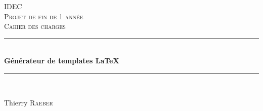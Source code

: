 \begin{titlepage}

\newcommand{\HRule}{\rule{\linewidth}{0.5mm}} %

\center %


\textsc{\LARGE IDEC}\\[1.5cm] %
\textsc{\Large Projet de fin de 1 année}\\[0.5cm] %
\textsc{\large Cahier des charges}\\[0.5cm] %


\HRule \\[0.4cm]
{ \huge \bfseries Générateur de templates \LaTeX{}}\\[0.4cm] %
\HRule \\[1.5cm]


\begin{minipage}{\textwidth}
\begin{center} \large
Thierry \textsc{Raeber} %
\end{center}
\end{minipage}\\[4cm]



\end{titlepage}

